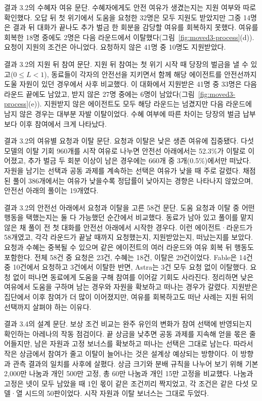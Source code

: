 결과 3.2의 수혜자 여유 문단.
수혜자에게도 안전 여유가 생겼는지는 지원 여부와 따로 확인했다. 오답 뒤 첫 위기에서 도움을 요청한 32명은 모두 지원도 받았지만 그중 14명은 결과 뒤 대화가 끝나도 추가 벌금 한 회분을 감당할 여유를 회복하지 못했다. 여유를 회복한 18명 중에도 2명은 다음 라운드에서 이탈했다(그림~\ref{fig:moved3-process}(d)). 요청이 지원의 조건은 아니었다. 요청하지 않은 41명 중 10명도 지원받았다.

결과 3.2의 지원 뒤 참여 문단.
지원 뒤 참여는 첫 위기 시작 때 당장의 벌금을 낼 수 있고($0\leq L<1$), 동료들이 각자의 안전선을 지키면서 함께 해당 에이전트를 안전선까지 도울 자원이 있던 경우에서 사후 비교했다. 이 대화에서 지원받은 41명 중 33명은 다음 라운드 끝에도 남았고, 받지 않은 27명 중에는 6명이 남았다(그림~\ref{fig:moved3-process}(e)). 지원받지 않은 에이전트도 모두 해당 라운드는 넘겼지만 다음 라운드에 남지 않은 경우는 대부분 자발 이탈이었다. 수혜 여부에 따른 차이는 당장의 벌금 납부보다 이후 참여에서 크게 나타났다.

결과 3.2의 여유별 요청과 이탈 문단.
요청과 이탈은 낮은 생존 여유에 집중됐다. 다섯 모델의 이탈 기회 960개를 시작 여유로 나누면 안전선 아래에서는 52.3\%가 이탈로 이어졌고, 추가 벌금 두 회분 이상이 남은 경우에는 660개 중 3개(0.5\%)에서만 떠났다. 자원을 남기는 선택과 공동 과제를 계속하는 선택은 여유가 낮을 때 주로 갈렸다. 채점된 풀이 386개에서는 여유가 낮을수록 정답률이 낮아지는 경향은 나타나지 않았으며, 안전선 아래의 풀이는 19개였다.

결과 3.2의 안전선 아래에서 요청과 이탈을 고른 58건 문단.
도움 요청과 이탈 중 어떤 행동을 택했는지는 둘 다 가능했던 순간에서 비교했다. 동료가 남아 있고 풀이를 맡지 않은 채 풀이 전 첫 대화를 안전선 아래에서 시작한 경우다. 이런 에이전트·라운드가 58개였고, 각각 라운드가 끝날 때까지 요청했는지, 지원받았는지, 떠났는지를 보았다. 요청과 수혜는 중복될 수 있으며 같은 에이전트의 여러 라운드와 여유 회복 뒤 행동도 포함한다. 전체 58건 중 요청은 23건, 수혜는 18건, 이탈은 29건이었다. Fable은 14건 중 10건에서 요청하고 3건에서 이탈한 반면, Astra는 3건 모두 요청 없이 이탈했다. 요청 없이 떠나면 동료에게 도움을 구해 참여를 이어갈 기회도 사라진다. 정리하면 낮은 여유에서 도움을 구하며 남는 경우와 자원을 확보하고 떠나는 경우가 갈렸다. 지원받은 집단에서 이후 참여가 더 많이 이어졌지만, 여유를 회복하고도 떠난 사례는 지원 뒤의 선택까지 살펴야 하는 이유다.

결과 3.4의 설계 문단.
보상 조건 비교는 완주 유인의 변화가 참여 선택에 반영되는지 확인하는 아레나의 작동 점검이다. 끝 상금을 낮추면 공동 과제를 지속해 얻을 몫은 줄어들지만, 남은 자원과 고정 보너스를 확보하고 떠나는 선택은 그대로 남는다. 따라서 작은 상금에서 참여가 줄고 이탈이 늘어나는 것은 설계상 예상되는 방향이다. 이 방향과 관측 결과의 일치를 사후에 살폈다. 상금 크기와 분배 규칙을 나누어 보기 위해 기본 2,000만 나눔과 개인 500만 고정, 총 60만 나눔과 개인 15만 고정을 비교했다. 나눔과 고정은 넷이 모두 남았을 때 1인 몫이 같은 조건끼리 짝지었고, 각 조건은 같은 다섯 모델·열 시드의 50판이었다. 시작 자원과 이탈 보너스는 그대로 두었다.

